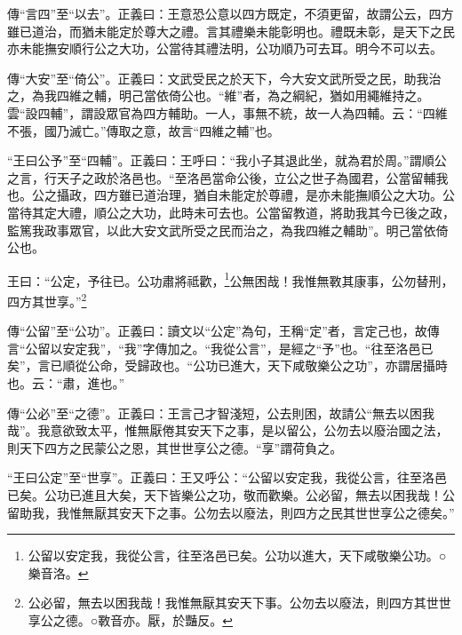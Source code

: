 {\noindent\zhuan{}\fzbyks 傳“言四”至“以去”。正義曰：王意恐公意以四方既定，不須更留，故謂公云，四方雖已道治，而猶未能定於尊大之禮。言其禮樂未能彰明也。禮既未彰，是天下之民亦未能撫安順行公之大功，公當待其禮法明，公功順乃可去耳。明今不可以去。 \par}

{\noindent\zhuan{}\fzbyks 傳“大安”至“倚公”。正義曰：文武受民之於天下，今大安文武所受之民，助我治之，為我四維之輔，明己當依倚公也。“維”者，為之綱紀，猶如用繩維持之。雲“設四輔”，謂設眾官為四方輔助。一人，事無不統，故一人為四輔。云：“四維不張，國乃滅亡。”傳取之意，故言“四維之輔”也。 \par}

{\noindent\shu{}\fzkt “王曰公予”至“四輔”。正義曰：王呼曰：“我小子其退此坐，就為君於周。”謂順公之言，行天子之政於洛邑也。“至洛邑當命公後，立公之世子為國君，公當留輔我也。公之攝政，四方雖已道治理，猶自未能定於尊禮，是亦未能撫順公之大功。公當待其定大禮，順公之大功，此時未可去也。公當留教道，將助我其今已後之政，監篤我政事眾官，以此大安文武所受之民而治之，為我四維之輔助”。明己當依倚公也。 \par}

王曰：“公定，予往已。公功肅將祗歡，\footnote{公留以安定我，我從公言，往至洛邑已矣。公功以進大，天下咸敬樂公功。○樂音洛。}公無困哉！我惟無斁其康事，公勿替刑，四方其世享。”\footnote{公必留，無去以困我哉！我惟無厭其安天下事。公勿去以廢法，則四方其世世享公之德。○斁音亦。厭，於豔反。}


{\noindent\zhuan{}\fzbyks 傳“公留”至“公功”。正義曰：讀文以“公定”為句，王稱“定”者，言定己也，故傳言“公留以安定我”，“我”字傳加之。“我從公言”，是經之“予”也。“往至洛邑已矣”，言已順從公命，受歸政也。“公功已進大，天下咸敬樂公之功”，亦謂居攝時也。云：“肅，進也。” \par}

{\noindent\zhuan{}\fzbyks 傳“公必”至“之德”。正義曰：王言己才智淺短，公去則困，故請公“無去以困我哉”。我意欲致太平，惟無厭倦其安天下之事，是以留公，公勿去以廢治國之法，則天下四方之民蒙公之恩，其世世享公之德。“享”謂荷負之。 \par}

{\noindent\shu{}\fzkt “王曰公定”至“世享”。正義曰：王又呼公：“公留以安定我，我從公言，往至洛邑已矣。公功已進且大矣，天下皆樂公之功，敬而歡樂。公必留，無去以困我哉！公留助我，我惟無厭其安天下之事。公勿去以廢法，則四方之民其世世享公之德矣。” \par}

